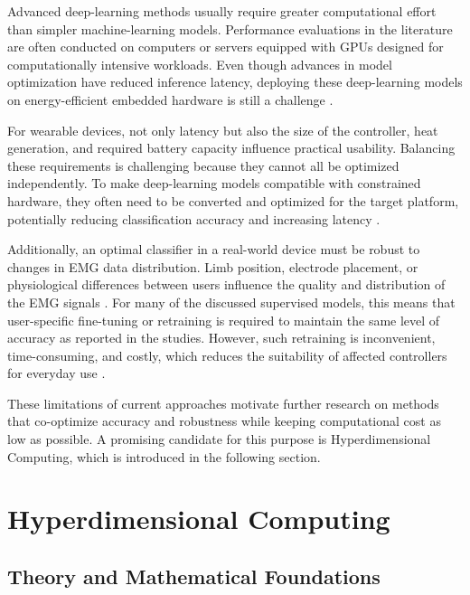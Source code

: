 Advanced deep-learning methods usually require greater computational effort than simpler machine-learning models. Performance evaluations in the literature are often conducted on computers or servers equipped with GPUs designed for computationally intensive workloads. Even though advances in model optimization have reduced inference latency, deploying these deep-learning models on energy-efficient embedded hardware is still a challenge \cite{zhong_deep_2026}.

For wearable devices, not only latency but also the size of the controller, heat generation, and required battery capacity influence practical usability. Balancing these requirements is challenging because they cannot all be optimized independently. To make deep-learning models compatible with constrained hardware, they often need to be converted and optimized for the target platform, potentially reducing classification accuracy and increasing latency \cite{shah_enabling_2025}.

Additionally, an optimal classifier in a real-world device must be robust to changes in EMG data distribution. Limb position, electrode placement, or physiological differences between users influence the quality and distribution of the EMG signals \cite{zhong_deep_2026}. For many of the discussed supervised models, this means that user-specific fine-tuning or retraining is required to maintain the same level of accuracy as reported in the studies. However, such retraining is inconvenient, time-consuming, and costly, which reduces the suitability of affected controllers for everyday use \cite{asfour_featureclassifier_2022}.

These limitations of current approaches motivate further research on methods that co-optimize accuracy and robustness while keeping computational cost as low as possible. A promising candidate for this purpose is Hyperdimensional Computing, which is introduced in the following section.


\section{Hyperdimensional Computing}
    \subsection{Theory and Mathematical Foundations}
    \label{sec:HDC_math_theory}

